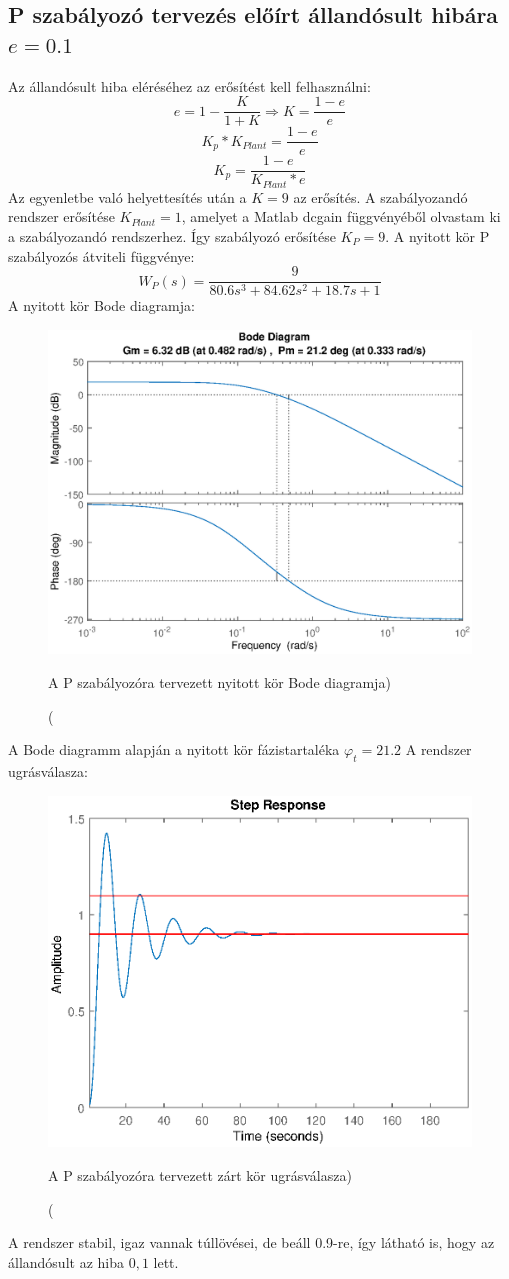 \documentclass[12pt]{article}
\begin{document}
\subsection{P szabályozó tervezés előírt állandósult hibára $e=0.1$}
Az állandósult hiba eléréséhez az erősítést kell felhasználni:
\[e=1-\frac{K}{1+K}\Rightarrow K=\frac{1-e}{e}\]
\[K_p*K_{Plant}=\frac{1-e}{e}\]
\[K_p=\frac{1-e}{K_{Plant}*e}\]
Az egyenletbe való helyettesítés után a $K=9$ az erősítés. A szabályozandó rendszer erősítése $K_{Plant}=1$, amelyet a Matlab dcgain függvényéből olvastam ki a szabályozandó rendszerhez. Így szabályozó erősítése $K_P=9$. A nyitott kör P szabályozós átviteli függvénye:
\[W_P(s)=\frac{9}{80.6s^3+84.62s^2+18.7s+1}\]
A nyitott kör Bode diagramja:
\begin{figure}[H]
\centering
\includegraphics[scale=.70]{WOERRORMARGIN}
\caption(A P szabályozóra tervezett nyitott kör Bode diagramja)
\end{figure}
A Bode diagramm alapján a nyitott kör fázistartaléka $\varphi_t=21.2$ 
A rendszer ugrásválasza:
\begin{figure}[H]
\centering
\includegraphics[scale=.70]{WCLOSEDERORSTEP}
\caption(A P szabályozóra tervezett zárt kör ugrásválasza)
\end{figure}
A rendszer stabil, igaz vannak túllövései, de beáll 0.9-re, így látható is, hogy az állandósult az hiba $0,1$ lett.
\end{document}
